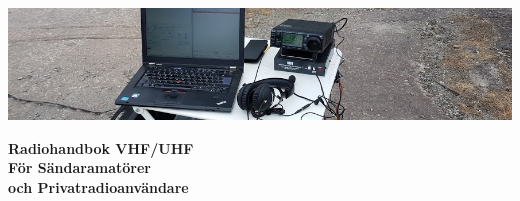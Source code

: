 \newcommand{\TitleText}{Radiohandbok VHF/UHF}
\newcommand{\SubtitleText}{För Sändaramatörer\\ och Privatradioanvändare}
\newcommand{\Forfattare}{Täpp-Anders Sikvall}
\newcommand{\Initialer}{SMØUEI}
\newcommand{\DokYear}{19}
\newcommand{\DokVersion}{2.2.0}
\newcommand{\DokumentRevision}{x.y.z}
\newcommand{\DokumentDatum}{\today}


\renewcommand{\arraystretch}{1.15}

\titlefoottrue %



	
	
	\pagestyle{empty}
	\vfill
	\vspace*{4cm}
	\centerline{\includegraphics[width=\paperwidth]{logo/rubrikbild}}
	\begin{flushright}
		\Huge{\bfseries{\TitleText}} \\[3mm]
		\Large{\bfseries{\SubtitleText}}
	\end{flushright}
	
	\vfill
	
	

